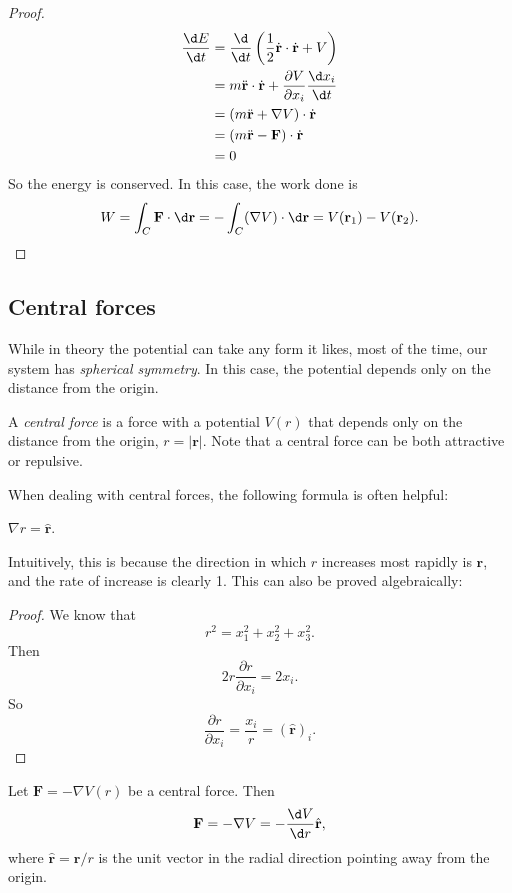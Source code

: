 \documentclass[a4paper]{article}
\begin{document}
\begin{proof}
  \begin{align*}
    \frac{\d E}{\d t} &= \frac{\d}{\d t}\left(\frac{1}{2}\dot{\mathbf{r}}\cdot \dot{\mathbf{r}} + V\right)\\
    &= m\ddot{\mathbf{r}}\cdot \dot{\mathbf{r}} + \frac{\partial V}{\partial x_i}\frac{\d x_i}{\d t}\\
    &= (m\ddot{\mathbf{r}} + \nabla V)\cdot \dot{\mathbf{r}}\\
    &= (m\ddot{\mathbf{r}} - \mathbf{F})\cdot \dot{\mathbf{r}}\\
    &= 0
  \end{align*}
  So the energy is conserved. In this case, the work done is
  \[
    W = \int_C \mathbf{F}\cdot \d \mathbf{r} = -\int_C (\nabla V)\cdot \d \mathbf{r} = V(\mathbf{r}_1) - V(\mathbf{r}_2).
  \]
\end{proof}
\subsection{Central forces}
While in theory the potential can take any form it likes, most of the time, our system has \emph{spherical symmetry}. In this case, the potential depends only on the distance from the origin.
\begin{defi}
  A \emph{central force} is a force with a potential $V(r)$ that depends only on the distance from the origin, $r = |\mathbf{r}|$. Note that a central force can be both attractive or repulsive.
\end{defi}

When dealing with central forces, the following formula is often helpful:
\begin{prop}
  $\nabla r = \hat{\mathbf{r}}$.
\end{prop}
Intuitively, this is because the direction in which $r$ increases most rapidly is $\mathbf{r}$, and the rate of increase is clearly 1. This can also be proved algebraically:

\begin{proof}
  We know that
  \[
    r^2 = x_1^2 + x_2^2 + x_3^2.
  \]
  Then
  \[
    2r\frac{\partial r}{\partial x_i} = 2x_i.
  \]
  So
  \[
    \frac{\partial r}{\partial x_i} = \frac{x_i}{r} = (\hat{\mathbf{r}})_i.
  \]
\end{proof}

\begin{prop}
  Let $\mathbf{F} = -\nabla V(r)$ be a central force. Then
  \[
    \mathbf{F} = -\nabla V = -\frac{\d V}{\d r} \hat{\mathbf{r}},
  \]
  where $\hat{\mathbf{r}} = \mathbf{r}/r$ is the unit vector in the radial direction pointing away from the origin.
\end{prop}
\end{document}
